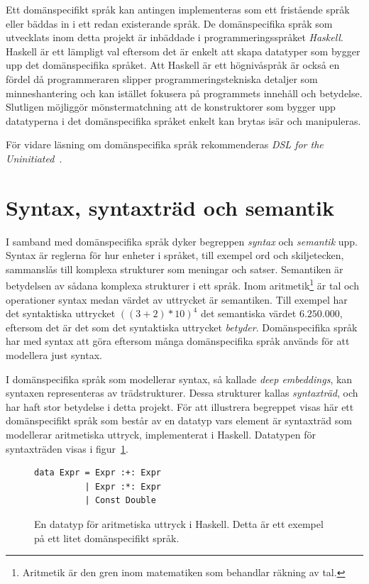 Ett domänspecifikt språk kan antingen implementeras som ett fristående språk
eller bäddas in i ett redan existerande språk. De domänspecifika språk som
utvecklats inom detta projekt är inbäddade i programmeringsspråket
\textit{Haskell}. Haskell är ett lämpligt val eftersom det är enkelt att skapa
datatyper som bygger upp det domänspecifika språket. Att Haskell är ett
högnivåspråk är också en fördel då programmeraren slipper programmeringstekniska detaljer som
minneshantering och kan istället fokusera på programmets innehåll
och betydelse. Slutligen möjliggör mönstermatchning att de konstruktorer som bygger
upp datatyperna i det domänspecifika språket enkelt kan brytas isär och manipuleras.

För vidare läsning om domänspecifika språk rekommenderas \textit{DSL for the Uninitiated}~\cite{DSLU}.

\section{Syntax, syntaxträd och semantik}\label{sec:syntax}

I samband med domänspecifika språk dyker begreppen \textit{syntax} och
\textit{semantik} upp. Syntax är reglerna för hur enheter i språket, till exempel ord och skiljetecken, sammanslås till komplexa strukturer som meningar och
satser. Semantiken är betydelsen av sådana komplexa strukturer i ett språk.
Inom aritmetik\footnote{Aritmetik är
  den gren inom matematiken som behandlar räkning av tal.} är tal och
operationer syntax medan värdet av uttrycket är semantiken.  Till
exempel har det syntaktiska uttrycket $((3 + 2) * 10)^4$ det semantiska värdet $6.250.000$,
eftersom det är det som det syntaktiska uttrycket \textit{betyder}.
Domänspecifika språk har med syntax att göra eftersom många
domänspecifika språk används för att modellera just syntax.

I domänspecifika språk som modellerar syntax, så kallade \textit{deep
embeddings}, kan syntaxen representeras av trädstrukturer. Dessa
strukturer kallas \textit{syntaxträd}, och har haft stor betydelse i detta projekt.
För att illustrera begreppet visas här ett domänspecifikt språk som består av en
datatyp vars element är
syntaxträd som modellerar aritmetiska uttryck, implementerat i Haskell.
Datatypen för syntaxträden visas i figur~\ref{fig:syntax_exempel}.

\begin{figure}[tph]
  \begin{lstlisting}
data Expr = Expr :+: Expr
          | Expr :*: Expr
          | Const Double
  \end{lstlisting}
  \caption{En datatyp för aritmetiska uttryck i Haskell. Detta är ett exempel på
           ett litet domänspecifikt språk.}\label{fig:syntax_exempel}
\end{figure}

